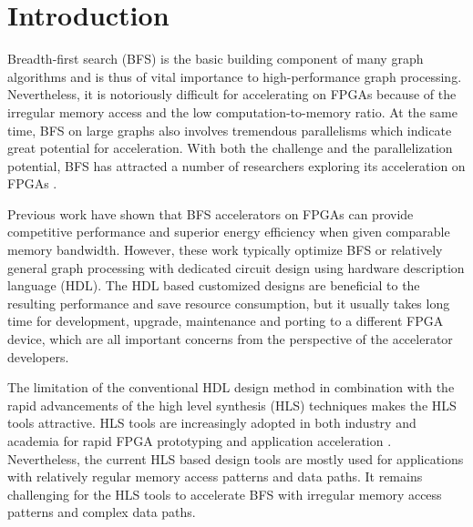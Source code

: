 \section{Introduction} \label{sec:intro}
Breadth-first search (BFS) is the basic building component of many graph algorithms 
and is thus of vital importance to high-performance graph processing. Nevertheless, 
it is notoriously difficult for accelerating on FPGAs because of the 
irregular memory access and the low computation-to-memory ratio. 
At the same time, BFS on large graphs also involves tremendous 
parallelisms which indicate great potential for acceleration. 
With both the challenge and the parallelization potential, 
BFS has attracted a number of researchers exploring its acceleration on FPGAs 
\cite{attia2014cygraph, betkaoui2012reconfigurable, Dai2017foregraph, Ma2017fpga,
umuroglu2015hybrid, oguntebi2016graphops, engelhardt2016gravf, zhou2016high}. 

Previous work have shown that BFS accelerators on FPGAs can provide competitive  
performance and superior energy efficiency when given comparable memory bandwidth. 
However, these work typically optimize BFS or relatively general graph processing 
with dedicated circuit design using hardware description language (HDL). The HDL 
based customized designs are beneficial to the resulting performance 
and save resource consumption, but it usually takes long time for development, 
upgrade, maintenance and porting to a different FPGA device, which are all 
important concerns from the perspective of the accelerator developers. 


The limitation of the conventional HDL design method in combination with the 
rapid advancements of the high level synthesis (HLS) techniques makes the HLS tools attractive. 
HLS tools are increasingly adopted in both industry and academia for rapid FPGA 
prototyping and application acceleration \cite{koch2016fpgas, xilinx-sdaccel}. 
Nevertheless, the current HLS based design tools are mostly used for 
applications with relatively regular memory access patterns and data paths. 
It remains challenging for the HLS tools to accelerate BFS with irregular 
memory access patterns and complex data paths. 

